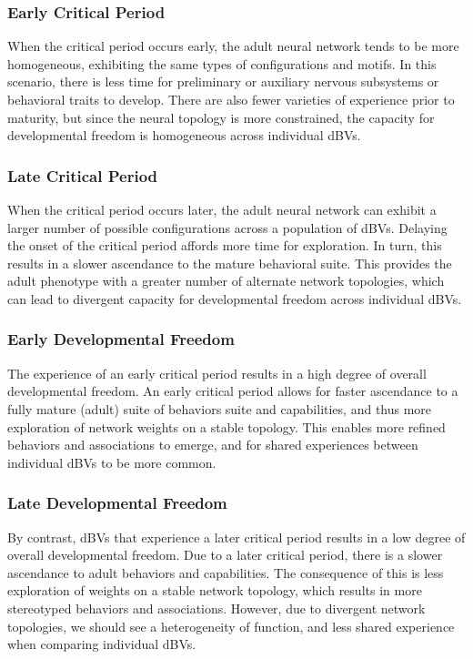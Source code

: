 \documentclass{article}
\begin{document}
\subsubsection{Early Critical Period}

When the critical period occurs early, the adult neural network tends to be more homogeneous, exhibiting the same types of configurations and motifs. In this scenario, there is less time for preliminary or auxiliary nervous subsystems or behavioral traits to develop. There are also fewer varieties of experience prior to maturity, but since the neural topology is more constrained, the capacity for developmental freedom is homogeneous across individual dBVs.

\subsubsection{Late Critical Period}

When the critical period occurs later, the adult neural network can exhibit a larger number of possible configurations across a population of dBVs. Delaying the onset of the critical period affords more time for exploration. In turn, this results in a slower ascendance to the mature behavioral suite. This provides the adult phenotype with a greater number of alternate network topologies, which can lead to divergent capacity for developmental freedom across individual dBVs. 

\subsubsection{Early Developmental Freedom}

The experience of an early critical period results in a high degree of overall developmental freedom. An early critical period allows for faster ascendance to a fully mature (adult) suite of behaviors suite and capabilities, and thus more exploration of network weights on a stable topology. This enables more refined behaviors and associations to emerge, and for shared experiences between individual dBVs to be more common.

\subsubsection{Late Developmental Freedom}

By contrast, dBVs that experience a later critical period results in a low degree of overall developmental freedom. Due to a later critical period, there is a slower ascendance to adult behaviors and capabilities. The consequence of this is less exploration of weights on a stable network topology, which results in more stereotyped behaviors and associations. However, due to divergent network topologies, we should see a heterogeneity of function, and less shared experience when comparing individual dBVs.
\end{document}
